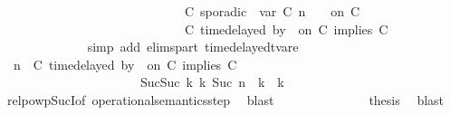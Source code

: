 \begin{isabellebody}
\ \ \ \ \ \ \ \ \ \ \ \ \ \ \ \ \ \ \ \ \ \ \ \ \ \ \ \ {\isasymturnstile}\ {\isacharparenleft}C\ sporadic{\isasymsharp}\ {\isasymlparr}\ {\isasymtau}\isactrlsub v\isactrlsub a\isactrlsub r\ {\isacharparenleft}C\ n{\isacharparenright}\ {\isasymoplus}\ {\isasymdelta}{\isasymtau}\ {\isasymrparr}\ on\ C\ {\isacharhash}\ {\isasymPsi}\isanewline
\ \ \ \ \ \ \ \ \ \ \ \ \ \ \ \ \ \ \ \ \ \ \ \ \ \ \ \ {\isasymtriangleright}\ {\isacharparenleft}{\isacharparenleft}C\ time{\isacharminus}delayed{\isasymbowtie}\ by\ {\isasymdelta}{\isasymtau}\ on\ C\ implies\ C\ {\isacharhash}\ {\isasymPhi}{\isacharparenright}{\isacharparenright}{\isacartoucheclose}\isanewline
\ \ \ \ \ \ \ \ \ \ \ \ \isamarkupfalse%
\ {\isacharparenleft}simp\ add{\isacharcolon}\ elims{\isacharunderscore}part\ timedelayed{\isacharunderscore}tvar{\isacharunderscore}e{}{\isacharparenright}\isanewline
\ \ \ \ \ \ \ \ \ \ \isamarkupfalse%
\ \isamarkupfalse%
\ {\isacartoucheopen}{\isacharparenleft}{\isasymGamma}{\isacharcomma}\ n\ {\isasymturnstile}\ {\isacharparenleft}{\isacharparenleft}C\ time{\isacharminus}delayed{\isasymbowtie}\ by\ {\isasymdelta}{\isasymtau}\ on\ C\ implies\ C\ {\isacharhash}\ {\isasymPsi}{\isacharparenright}\ {\isasymtriangleright}\ {\isasymPhi}{\isacharparenright}\isanewline
\ \ \ \ \ \ \ \ \ \ \ \ \ \ \ \ \ \ \ \ \ \ {\isasymhookrightarrow}\isactrlbsup Suc{\isacharparenleft}Suc\ k{\isacharparenright}\isactrlesup \ {\isacharparenleft}{\isasymGamma}\isactrlsub k{\isacharcomma}\ Suc\ n\ {\isasymturnstile}\ {\isasymPsi}\isactrlsub k\ {\isasymtriangleright}\ {\isasymPhi}\isactrlsub k{\isacharparenright}{\isacartoucheclose}\isanewline
\ \ \ \ \ \ \ \ \ \ \ \ \isamarkupfalse%
\ relpowp{\isacharunderscore}Suc{\isacharunderscore}I{}{\isacharbrackleft}of\ {\isacartoucheopen}operational{\isacharunderscore}semantics{\isacharunderscore}step{\isacartoucheclose}{\isacharbrackright}\ \isamarkupfalse%
\ blast\isanewline
\ \ \ \ \ \ \ \ \ \ \isamarkupfalse%
\ {\isacharasterisk}\ \isamarkupfalse%
\ {\isacharquery}thesis\ \isamarkupfalse%
\ blast\isanewline
\ \ \ \ \ \ \ \ \isamarkupfalse%
\isanewline
\ \ \ \ \ \ \isamarkupfalse%

\end{isabellebody}

